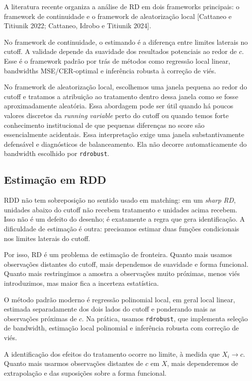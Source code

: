 \documentclass[
]{article}
\begin{document}
A literatura recente organiza a análise de RD em dois frameworks principais: o framework de continuidade e o framework de aleatorização local {[}Cattaneo e Titiunik 2022; Cattaneo, Idrobo e Titiunik 2024{]}.

No framework de continuidade, o estimando é a diferença entre limites laterais no cutoff. A validade depende da suavidade dos resultados potenciais ao redor de \(c\). Esse é o framework padrão por trás de métodos como regressão local linear, bandwidths MSE/CER-optimal e inferência robusta à correção de viés.

No framework de aleatorização local, escolhemos uma janela pequena ao redor do cutoff e tratamos a atribuição ao tratamento dentro dessa janela como se fosse aproximadamente aleatória. Essa abordagem pode ser útil quando há poucos valores discretos da \emph{running variable} perto do cutoff ou quando temos forte conhecimento institucional de que pequenas diferenças no score são essencialmente acidentais. Essa interpretação exige uma janela substantivamente defensável e diagnósticos de balanceamento. Ela não decorre automaticamente do bandwidth escolhido por \texttt{rdrobust}.

\subsection{Estimação em RDD}\label{estimauxe7uxe3o-em-rdd}

RDD não tem sobreposição no sentido usado em matching: em um \emph{sharp RD}, unidades abaixo do cutoff não recebem tratamento e unidades acima recebem. Isso não é um defeito do desenho; é exatamente a regra que gera identificação. A dificuldade de estimação é outra: precisamos estimar duas funções condicionais nos limites laterais do cutoff.

Por isso, RD é um problema de estimação de fronteira. Quanto mais usamos observações distantes do cutoff, mais dependemos de suavidade e forma funcional. Quanto mais restringimos a amostra a observações muito próximas, menos viés introduzimos, mas maior fica a incerteza estatística.

O método padrão moderno é regressão polinomial local, em geral local linear, estimada separadamente dos dois lados do cutoff e ponderando mais as observações próximas de \(c\). Na prática, usamos \texttt{rdrobust}, que implementa seleção de bandwidth, estimação local polinomial e inferência robusta com correção de viés.

A identificação dos efeitos do tratamento ocorre no limite, à medida que \(X_i \rightarrow c\). Quanto mais usarmos observações distantes de \(c\) em \(X\), mais dependeremos de extrapolação e das suposições sobre a forma funcional.
\end{document}
